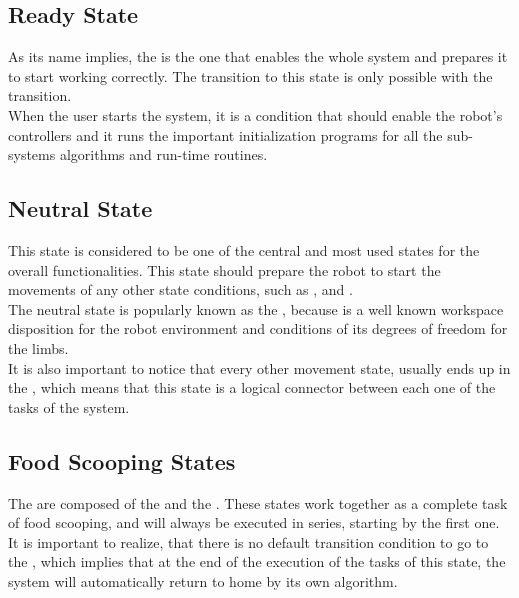 \documentclass[11pt]{report} %
\begin{document}
\subsection{Ready State}

As its name implies, the  is the one that enables the whole system and prepares it to start working correctly. The transition to this state is only possible with the  transition.\\

When the user starts the system, it is a condition that should enable the robot's controllers and it runs the important initialization programs for all the sub-systems algorithms and run-time routines.\\

\subsection{Neutral State}

This state is considered to be one of the central and most used states for the overall functionalities. This state should prepare the robot to start the movements of any other state conditions, such as ,  and .\\

The neutral state is popularly known as the , because is a well known workspace disposition for the robot environment and conditions of its degrees of freedom for the limbs.\\

It is also important to notice that every other movement state, usually ends up in the , which means that this state is a logical connector between each one of the tasks of the system.\\

\subsection{Food Scooping States}

The  are composed of the  and the . These states work together as a complete task of food scooping, and will always be executed in series, starting by the first one.\\

It is important to realize, that there is no default transition condition to go to the , which implies that at the end of the execution of the tasks of this state, the system will automatically return to home by its own algorithm.\\
\end{document}
